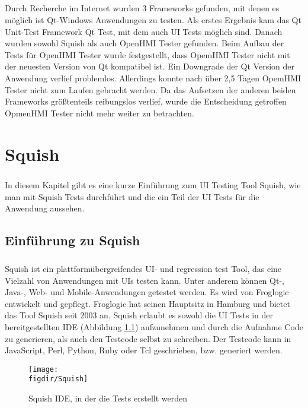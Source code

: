 		\paragraph{}Durch Recherche im Internet wurden 3 Frameworks gefunden, mit denen es möglich ist Qt-Windows Anwendungen zu testen. Als erstes Ergebnis kam das Qt Unit-Test Framework Qt Test, mit dem auch UI Tests möglich sind. Danach wurden sowohl Squish als auch OpenHMI Tester gefunden. Beim Aufbau der Tests für OpenHMI Tester wurde festgestellt, dass OpemHMI Tester nicht mit der neuesten Version von Qt kompatibel ist. Ein Downgrade der Qt Version der Anwendung verlief problemlos. Allerdings konnte nach über 2,5 Tagen OpemHMI Tester nicht zum Laufen gebracht werden. Da das Aufsetzen der anderen beiden Frameworks größtenteils reibungslos verlief, wurde die Entscheidung getroffen OpmenHMI Tester nicht mehr weiter zu betrachten.

\chapter{Squish}
		\paragraph{} In diesem Kapitel gibt es eine kurze Einführung zum UI Testing Tool Squish, wie man mit Squish Tests durchführt und die ein Teil der UI Tests für die Anwendung aussehen. 
		\section{Einführung zu Squish}
		\paragraph{} Squish ist ein plattformübergreifendes UI- und regression test Tool, das eine Vielzahl von Anwendungen mit UIs testen kann. Unter anderem können Qt-, Java-, Web- und Mobile-Anwendungen getestet werden. Es wird von Froglogic entwickelt und gepflegt. Froglogic hat seinen Hauptsitz in Hamburg und bietet das Tool Squish seit 2003 an\cite{Squish}. Squish erlaubt es sowohl die UI Tests in der bereitgestellten IDE (Abbildung \ref{FIG:Squish}) aufzunehmen und durch die Aufnahme Code zu generieren, als auch den Testcode selbst zu schreiben. Der Testcode kann in JavaScript, Perl, Python, Ruby oder Tcl geschrieben, bzw. generiert werden.
		
		\begin{figure}[t]		
			\centering
			\texttt{[image: \\figdir/Squish]}
			
			\caption[Squish IDE]
			{Squish IDE, in der die Tests erstellt werden}
			\label{FIG:Squish}
		\end{figure}
		

